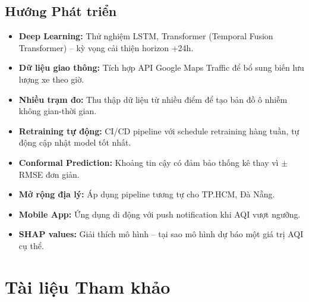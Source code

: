 \documentclass[12pt,a4paper]{report}
\begin{document}
\section{Hướng Phát triển}

\begin{itemize}
  \item \textbf{Deep Learning:} Thử nghiệm LSTM, Transformer (Temporal Fusion Transformer) -- kỳ vọng cải thiện horizon +24h.
  \item \textbf{Dữ liệu giao thông:} Tích hợp API Google Maps Traffic để bổ sung biến lưu lượng xe theo giờ.
  \item \textbf{Nhiều trạm đo:} Thu thập dữ liệu từ nhiều điểm để tạo bản đồ ô nhiễm không gian-thời gian.
  \item \textbf{Retraining tự động:} CI/CD pipeline với schedule retraining hàng tuần, tự động cập nhật model tốt nhất.
  \item \textbf{Conformal Prediction:} Khoảng tin cậy có đảm bảo thống kê thay vì $\pm$RMSE đơn giản.
  \item \textbf{Mở rộng địa lý:} Áp dụng pipeline tương tự cho TP.HCM, Đà Nẵng.
  \item \textbf{Mobile App:} Ứng dụng di động với push notification khi AQI vượt ngưỡng.
  \item \textbf{SHAP values:} Giải thích mô hình -- tại sao mô hình dự báo một giá trị AQI cụ thể.
\end{itemize}

\chapter*{Tài liệu Tham khảo}
\end{document}
